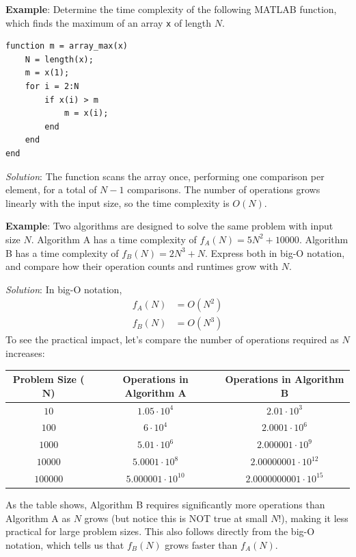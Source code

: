 \begin{exampleBox}
  \textbf{Example}: Determine the time complexity of the following MATLAB function, which finds the maximum of an array \texttt{x} of length $N$.
\begin{verbatim}
function m = array_max(x)
    N = length(x);
    m = x(1);
    for i = 2:N
        if x(i) > m
            m = x(i);
        end
    end
end
\end{verbatim}
  \emph{Solution}: The function scans the array once, performing one comparison per element, for a total of $N-1$ comparisons. The number of operations grows linearly with the input size, so the time complexity is $O(N)$.
\end{exampleBox}

\begin{exampleBox}
    \textbf{Example}: Two algorithms are designed to solve the same problem with input size $N$. Algorithm A has a time complexity of $f_A(N) = 5N^2 + 10000$. Algorithm B has a time complexity of $f_B(N) = 2N^3 + N$. Express both in big-O notation, and compare how their operation counts and runtimes grow with $N$.

    \emph{Solution}: In big-O notation,
    \begin{align*}
        f_A(N) &= O(N^2) \\
        f_B(N) &= O(N^3)
    \end{align*}
    To see the practical impact, let's compare the number of operations required as $N$ increases:
    \begin{center}
        \begin{tabular}{c|c|c}
            \textbf{Problem Size ($\boldsymbol{N}$)} & \textbf{Operations in Algorithm A} & \textbf{Operations in Algorithm B} \\
            \hline
            $10$ & $1.05\cdot 10^4$ & $2.01\cdot 10^3$ \\
            $100$ & $6\cdot 10^4$ & $2.0001\cdot 10^6$ \\
            $1000$ & $5.01\cdot 10^6$ & $2.000001\cdot 10^9$ \\
            $10000$ & $5.0001\cdot 10^{8}$ & $2.00000001\cdot 10^{12}$ \\
            $100000$ & $5.000001\cdot 10^{10}$ & $2.0000000001\cdot 10^{15}$ \\
        \end{tabular}
    \end{center}
    As the table shows, Algorithm B requires significantly more operations than Algorithm A as $N$ grows (but notice this is NOT true at small $N$!), making it less practical for large problem sizes. This also follows directly from the big-O notation, which tells us that $f_B(N)$ grows faster than $f_A(N)$.


\end{exampleBox}
